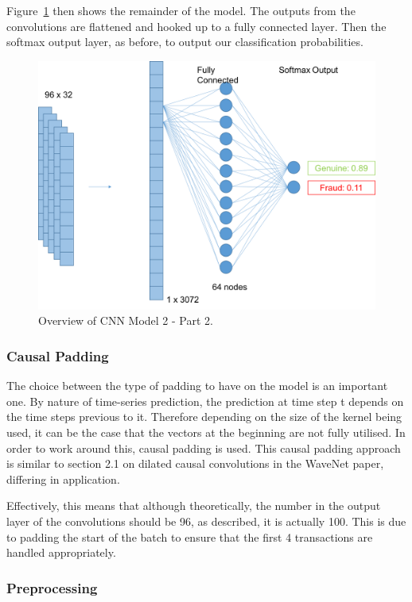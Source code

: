 \documentclass[12pt,a4paper,twoside]{report}
\begin{document}
Figure~\ref{fig:cnnv2-2} then shows the remainder of the model. The outputs from the convolutions are flattened and hooked up to a fully connected layer. Then the softmax output layer, as before, to output our classification probabilities. 

\begin{figure}[!htbp]
\centering
\includegraphics[scale=0.6]{cnnv2-2}
\caption{Overview of CNN Model 2 - Part 2.}
\label{fig:cnnv2-2}
\end{figure}

\subsubsection{Causal Padding}
The choice between the type of padding to have on the model is an important one. By nature of time-series prediction, the prediction at time step t depends on the time steps previous to it. Therefore depending on the size of the kernel being used, it can be the case that the vectors at the beginning are not fully utilised. In order to work around this, causal padding is used. This causal padding approach is similar to section 2.1 on dilated causal convolutions in the WaveNet\cite{DBLP:journals/corr/OordDZSVGKSK16} paper, differing in application. 

Effectively, this means that although theoretically, the number in the output layer of the convolutions should be 96, as described, it is actually 100. This is due to padding the start of the batch to ensure that the first 4 transactions are handled appropriately. 

\subsubsection{Preprocessing}
\end{document}
